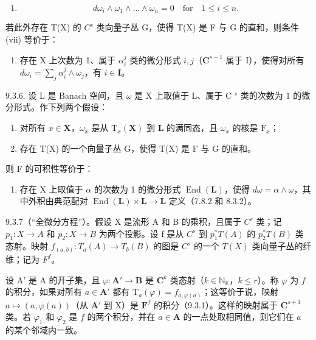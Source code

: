 \begin{enumerate}
\def\labelenumi{(\roman{enumi})}
\setcounter{enumi}{6}
\tightlist
\item
  \[
  d \omega_ {i} \wedge \omega_ {1} \wedge \dots \wedge \omega_ {n} = 0 \quad \text {for} \quad 1 \leqslant i \leqslant n.
  \]
\end{enumerate}

若此外存在 T(X) 的 \(C^{s}\) 类向量子丛 G，使得 T(X) 是 F 与 G 的直和，则条件 (vii) 等价于：

\begin{enumerate}
\def\labelenumi{(\roman{enumi})}
\setcounter{enumi}{7}
\tightlist
\item
  存在 X 上次数为 1、属于 \(\alpha_{i}^{j}\) 类的微分形式 \(i, j\)（\(\mathbf{C}^{s-1}\) 属于 I），使得对所有 \(d\omega_{i} = \sum_{j} \alpha_{i}^{j} \wedge \omega_{j}\)，有 \(i \in \mathbf{I}\)。
\end{enumerate}

9.3.6. 设 L 是 Banach 空间，且 \(\omega\) 是 X 上取值于 L、属于 C \(^{s}\) 类的次数为 1 的微分形式。作下列两个假设：

\begin{enumerate}
\def\labelenumi{\alph{enumi})}
\item
  对所有 \(x \in \mathbf{X}\)，\(\omega_x\) 是从 \(\mathrm{T}_x(\mathbf{X})\) 到 \(\mathbf{L}\) 的满同态，且 \(\omega_x\) 的核是 \(\mathrm{F}_x\)；
\item
  存在 T(X) 的一个向量子丛 G，使得 T(X) 是 F 与 G 的直和。
\end{enumerate}

则 F 的可积性等价于：

\begin{enumerate}
\def\labelenumi{(\roman{enumi})}
\setcounter{enumi}{8}
\tightlist
\item
  存在 X 上取值于 \(\alpha\) 的次数为 1 的微分形式 \(\operatorname{End}(\mathbf{L})\)，使得 \(d\omega = \alpha \wedge \omega\)，其中外积由典范配对 \(\operatorname{End}(\mathbf{L}) \times \mathbf{L} \to \mathbf{L}\) 定义（7.8.2 和 8.3.2）。
\end{enumerate}

9.3.7（“全微分方程”）。假设 X 是流形 A 和 B 的乘积，且属于 \(C^{r}\) 类；记 \(p_{1}: X \to A\) 和 \(p_{2}: X \to B\) 为两个投影。设 f 是从 \(C^{s}\) 到 \(p_{1}^{*}T(A)\) 的 \(p_{2}^{*}T(B)\) 类态射。映射 \(f_{(a,b)}: T_{a}(A) \to T_{b}(B)\) 的图是 \(C^{s}\) 的一个 \(T(X)\) 类向量子丛的纤维；记为 \(F^{f}\)。

设 A' 是 A 的开子集，且 \(\varphi: \mathbf{A}' \to \mathbf{B}\) 是 \(\mathbf{C}^k\) 类态射（\(k \in \mathbb{N}_{\mathbb{K}}\)，\(k \leqslant r\)）。称 \(\varphi\) 为 \(f\) 的积分，如果对所有 \(a \in \mathbf{A}'\) 都有 \(\mathrm{T}_a(\varphi) = f_{a,\varphi(a)}\)；这等价于说，映射 \(a \mapsto (a, \varphi(a))\)（从 \(\mathbf{A}'\) 到 X）是 \(\mathbf{F}^f\) 的积分（9.3.1）。这样的映射属于 \(\mathbf{C}^{s+1}\) 类。若 \(\varphi_1\) 和 \(\varphi_2\) 是 \(f\) 的两个积分，并在 \(a \in \mathbf{A}\) 的一点处取相同值，则它们在 \(a\) 的某个邻域内一致。

